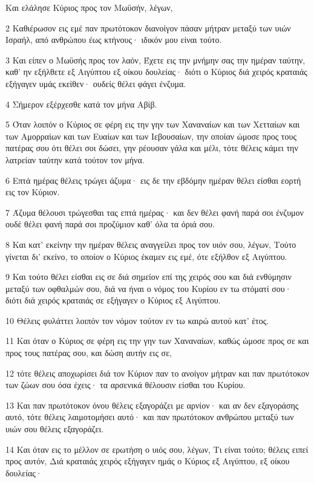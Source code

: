 \par Και ελάλησε Κύριος προς τον Μωϋσήν, λέγων,
\par 2 Καθιέρωσον εις εμέ παν πρωτότοκον διανοίγον πάσαν μήτραν μεταξύ των υιών Ισραήλ, από ανθρώπου έως κτήνους· ιδικόν μου είναι τούτο.
\par 3 Και είπεν ο Μωϋσής προς τον λαόν, Έχετε εις την μνήμην σας την ημέραν ταύτην, καθ' ην εξήλθετε εξ Αιγύπτου εξ οίκου δουλείας· διότι ο Κύριος διά χειρός κραταιάς εξήγαγεν υμάς εκείθεν· ουδείς θέλει φάγει ένζυμα.
\par 4 Σήμερον εξέρχεσθε κατά τον μήνα Αβίβ.
\par 5 Όταν λοιπόν ο Κύριος σε φέρη εις την γην των Χαναναίων και των Χετταίων και των Αμορραίων και των Ευαίων και των Ιεβουσαίων, την οποίαν ώμοσε προς τους πατέρας σου ότι θέλει σοι δώσει, γην ρέουσαν γάλα και μέλι, τότε θέλεις κάμει την λατρείαν ταύτην κατά τούτον τον μήνα.
\par 6 Επτά ημέρας θέλεις τρώγει άζυμα· εις δε την εβδόμην ημέραν θέλει είσθαι εορτή εις τον Κύριον.
\par 7 Άζυμα θέλουσι τρώγεσθαι τας επτά ημέρας· και δεν θέλει φανή παρά σοι ένζυμον ουδέ θέλει φανή παρά σοι προζύμιον καθ' όλα τα όριά σου.
\par 8 Και κατ' εκείνην την ημέραν θέλεις αναγγείλει προς τον υιόν σου, λέγων, Τούτο γίνεται δι' εκείνο, το οποίον ο Κύριος έκαμεν εις εμέ, ότε εξήλθον εξ Αιγύπτου.
\par 9 Και τούτο θέλει είσθαι εις σε διά σημείον επί της χειρός σου και διά ενθύμησιν μεταξύ των οφθαλμών σου, διά να ήναι ο νόμος του Κυρίου εν τω στόματί σου· διότι διά χειρός κραταιάς σε εξήγαγεν ο Κύριος εξ Αιγύπτου.
\par 10 Θέλεις φυλάττει λοιπόν τον νόμον τούτον εν τω καιρώ αυτού κατ' έτος.
\par 11 Και όταν ο Κύριος σε φέρη εις την γην των Χαναναίων, καθώς ώμοσε προς σε και προς τους πατέρας σου, και δώση αυτήν εις σε,
\par 12 τότε θέλεις αποχωρίσει διά τον Κύριον παν το ανοίγον μήτραν και παν πρωτότοκον των ζώων σου όσα έχεις· τα αρσενικά θέλουσιν είσθαι του Κυρίου.
\par 13 Και παν πρωτότοκον όνου θέλεις εξαγοράζει με αρνίον· και αν δεν εξαγοράσης αυτό, τότε θέλεις λαιμοτομήσει αυτό· και παν πρωτότοκον ανθρώπου μεταξύ των υιών σου θέλεις εξαγοράζει.
\par 14 Και όταν εις το μέλλον σε ερωτήση ο υιός σου, λέγων, Τι είναι τούτο; θέλεις ειπεί προς αυτόν, Διά κραταιάς χειρός εξήγαγεν ημάς ο Κύριος εξ Αιγύπτου, εξ οίκου δουλείας·
